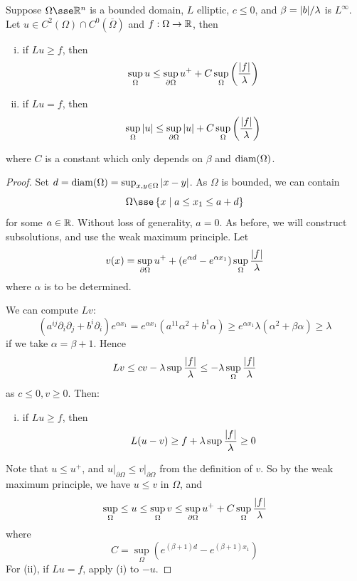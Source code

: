 \documentclass{article}
\begin{document}
\begin{theorem}
     Suppose \(\Omega \sse \R^n\) is a bounded domain, \(L\) elliptic, \(c \le 0\), and \(\beta = \abs{b}/\lambda\) is \(L^\infty\). Let \(u \in C^2(\Omega) \cap C^0(\overline\Omega)\) and \(f : \Omega \to \mathbb{R}\), then
    \begin{enumerate}[(i)]
        \item if \(Lu \ge f\), then
        \[\sup_\Omega u \le \sup_{\partial\Omega} u^+ + C\sup_\Omega\left(\frac{\abs{f}}{\lambda}\right)\]
        \item if \(Lu = f\), then
        \[\sup_\Omega \abs{u} \le \sup_{\partial\Omega}\abs{u} + C\sup_\Omega\left(\frac{\abs{f}}{\lambda}\right)\]
    \end{enumerate}
    where \(C\) is a constant which only depends on \(\beta\) and \(\operatorname{diam}(\Omega)\).
\end{theorem}

\begin{proof}
    Set \(d = \operatorname{diam}(\Omega) = \sup_{x, y \in \Omega}\abs{x - y}\). As \(\Omega\) is bounded, we can contain
    \[\Omega \sse \left\{x \mid a \le x_1 \le a + d\right\}\]
    for some \(a \in \mathbb{R}\). Without loss of generality, \(a = 0\). As before, we will construct subsolutions, and use the weak maximum principle. Let
    \[v(x) = \sup_{\partial\Omega}u^+ + (e^{\alpha d} - e^{\alpha x_1})\sup_{\Omega}\frac{\abs{f}}{\lambda}\]
    where \(\alpha\) is to be determined.

    We can compute \(Lv\):
    \[(a^{ij}\partial_i\partial_j + b^i\partial_i)e^{\alpha x_1} = e^{\alpha x_1}(a^{11}\alpha^2 + b^1\alpha) \ge e^{\alpha x_1}\lambda(\alpha^2 + \beta \alpha) \ge \lambda\]if we take \(\alpha = \beta + 1\). Hence
    \[Lv \le cv - \lambda \sup\frac{\abs{f}}{\lambda} \le -\lambda \sup_\Omega\frac{\abs{f}}{\lambda}\]
    as \(c \le 0, v \ge 0\). Then:
    \begin{enumerate}[(i)]
        \item if \(Lu \ge f\), then
        \[L(u - v)\ge f + \lambda \sup\frac{\abs{f}}{\lambda} \ge 0\]
    \end{enumerate}
    
    \lec

    Note that \(u \le u^+\), and \(u \vert_{\partial\Omega} \le v\vert_{\partial\Omega}\) from the definition of \(v\). So by the weak maximum principle, we have \(u \le v\) in \(\Omega\), and
    \[\sup_\Omega \le u \le \sup_\Omega v \le \sup_{\partial\Omega} u^+ + C\sup_\Omega \frac{\abs{f}}{\lambda}\]
    where
    \[C = \sup_\Omega\left(e^{(\beta + 1)d} - e^{(\beta + 1)x_1}\right)\]
    For (ii), if \(Lu = f\), apply (i) to \(-u\).
\end{proof}
\end{document}
